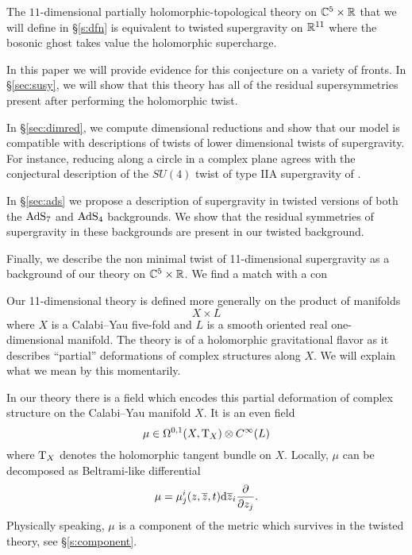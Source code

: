 \begin{conj}
The $11$-dimensional partially holomorphic-topological theory on $\mathbb C^5 \times \mathbb R$ that we will define in \S \ref{s:dfn} is equivalent to twisted supergravity on $\mathbb R^{11}$ where the bosonic ghost takes value the holomorphic supercharge. 
\end{conj}

In this paper we will provide evidence for this conjecture on a variety of fronts. 
In \S\ref{sec:susy}, we will show that this theory has all of the residual supersymmetries present after performing the holomorphic twist. 

In \S\ref{sec:dimred}, we compute dimensional reductions and show that our model is compatible with descriptions of twists of lower dimensional twists of supergravity. 
For instance, reducing along a circle in a complex plane agrees with the conjectural description of the $SU(4)$ twist of type IIA supergravity of \cite{CLsugra}.

In \S\ref{sec:ads} we propose a description of supergravity in twisted versions of both the ${\rm AdS}_7$ and ${\rm AdS}_4$ backgrounds. 
We show that the residual symmetries of supergravity in these backgrounds are present in our twisted background.

Finally, we describe the non minimal twist of 11-dimensional supergravity as a background of our theory on $\mathbb C^5 \times \mathbb R$. 
We find a match with a con 


Our 11-dimensional theory is defined more generally on the product of manifolds 
\[
X \times L
\]
where $X$ is a Calabi--Yau five-fold and $L$ is a smooth oriented real one-dimensional manifold. 
The theory is of a holomorphic gravitational flavor as it describes ``partial'' deformations of complex structures along $X$. 
We will explain what we mean by this momentarily. 

In our theory there is a field which encodes this partial deformation of complex structure on the Calabi--Yau manifold $X$.
It is an even field 
\[
\mu \in \Omega^{0,1} (X , {\rm T}_X) \otimes C^\infty(L) 
\]
where ${\rm T}_X$ denotes the holomorphic tangent bundle on $X$.
Locally, $\mu$ can be decomposed as Beltrami-like differential
\[
\mu = \mu^i_j (z,\overline{z}, t) {\rm d} \overline{z}_i \frac{\partial}{\partial z_j} .
\]
Physically speaking, $\mu$ is a component of the metric which survives in the twisted theory, see \S \ref{s:component}. 


